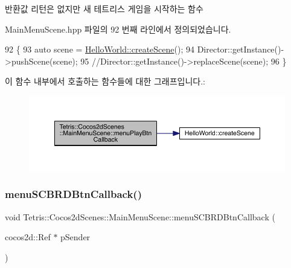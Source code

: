 \begin{DoxyReturn}{반환값}
리턴은 없지만 새 테트리스 게임을 시작하는 함수 
\end{DoxyReturn}


Main\+Menu\+Scene.\+hpp 파일의 92 번째 라인에서 정의되었습니다.


\begin{DoxyCode}
92                                                  \{
93         \textcolor{keyword}{auto} scene =  \hyperlink{class_hello_world_a1b700f5f9de04271533d3fa099d7b014}{HelloWorld::createScene}();
94         Director::getInstance()->pushScene(scene);
95         \textcolor{comment}{//Director::getInstance()->replaceScene(scene);}
96     \}
\end{DoxyCode}
이 함수 내부에서 호출하는 함수들에 대한 그래프입니다.\+:
\nopagebreak
\begin{figure}[H]
\begin{center}
\leavevmode
\includegraphics[width=350pt]{dc/d34/class_tetris_1_1_cocos2d_scenes_1_1_main_menu_scene_a19f4cf80f17731583bec6a25d8de5acd_cgraph}
\end{center}
\end{figure}
\mbox{\label{class_tetris_1_1_cocos2d_scenes_1_1_main_menu_scene_a2fdee3d586584f0186569ccd13d2d7fc}} 
\subsubsection{\texorpdfstring{menu\+S\+C\+B\+R\+D\+Btn\+Callback()}{menuSCBRDBtnCallback()}}
{\footnotesize\ttfamily void Tetris\+::\+Cocos2d\+Scenes\+::\+Main\+Menu\+Scene\+::menu\+S\+C\+B\+R\+D\+Btn\+Callback (\begin{DoxyParamCaption}\item[{cocos2d\+::\+Ref $\ast$}]{p\+Sender }\end{DoxyParamCaption})\hspace{0.3cm}{\ttfamily [inline]}}

